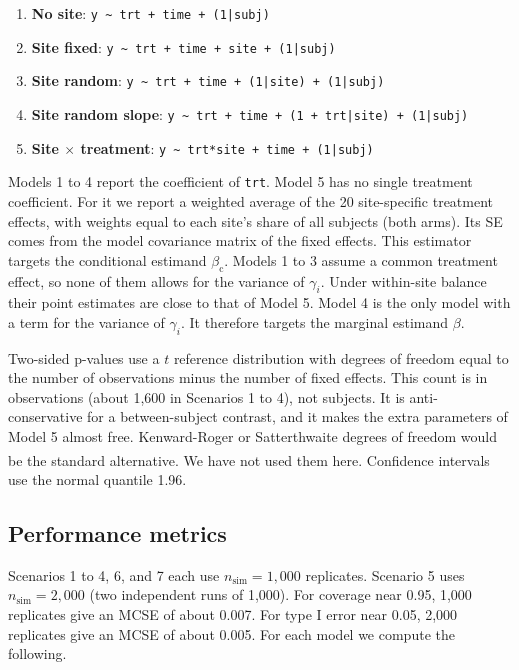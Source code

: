 \documentclass[
  11pt,
]{article}
\newcounter{none} %
\begin{document}
\begin{enumerate}
  \item \textbf{No site}: \texttt{y \~{} trt + time + (1|subj)}
  \item \textbf{Site fixed}:
    \texttt{y \~{} trt + time + site + (1|subj)}
  \item \textbf{Site random}:
    \texttt{y \~{} trt + time + (1|site) + (1|subj)}
  \item \textbf{Site random slope}:
    \texttt{y \~{} trt + time + (1 + trt|site) + (1|subj)}
  \item \textbf{Site $\times$ treatment}:
    \texttt{y \~{} trt*site + time + (1|subj)}
\end{enumerate}

Models 1 to 4 report the coefficient of \texttt{trt}. Model 5 has
no single treatment coefficient. For it we report a weighted
average of the 20 site-specific treatment effects, with weights
equal to each site's share of all subjects (both arms). Its SE comes
from the model covariance matrix of the fixed effects. This
estimator targets the conditional estimand \(\beta_{\mathrm{c}}\).
Models 1 to 3 assume a common treatment effect, so none of them
allows for the variance of \(\gamma_i\). Under within-site balance
their point estimates are close to that of Model 5. Model 4 is the
only model with a term for the variance of \(\gamma_i\). It
therefore targets the marginal estimand \(\beta\).

Two-sided p-values use a \(t\) reference distribution with degrees of
freedom equal to the number of observations minus the number of
fixed effects. This count is in observations (about 1,600 in
Scenarios 1 to 4), not subjects. It is anti-conservative for a
between-subject contrast, and it makes the extra parameters of
Model 5 almost free. Kenward-Roger or Satterthwaite degrees of
freedom would be the standard alternative\textsuperscript{}. We
have not used them here. Confidence intervals use the normal
quantile 1.96.

\subsection{Performance metrics}\label{performance-metrics}

Scenarios 1 to 4, 6, and 7 each use \(n_{\mathrm{sim}} = 1{,}000\)
replicates. Scenario 5 uses \(n_{\mathrm{sim}} = 2{,}000\) (two
independent runs of 1,000). For coverage near 0.95, 1,000
replicates give an MCSE of about 0.007. For type I error near 0.05,
2,000 replicates give an MCSE of about 0.005. For each model we
compute the following.
\end{document}
